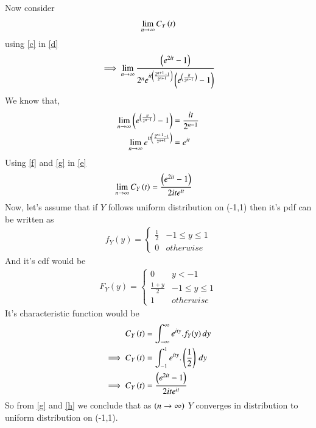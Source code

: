 \documentclass[journal,12pt,twocolumn]{IEEEtran}
\begin{document}
Now consider
\begin{align}
     \lim_{n\to\infty} C_{Y}\left(t\right)
     \label{d}
\end{align}
using \eqref{c} in \eqref{d}
\begin{align}
    \implies \lim_{n\to\infty}\frac{\left(e^{2it}-1\right)}{2^ne^{it\left(\frac{2^{n+1}-1}{2^{n+1}}\right)}\left(e^{\left(\frac{it}{2^{n-1}}\right)}-1\right)}
    \label{e}
\end{align}
We know that,
\begin{align}
    \lim_{n\to\infty}\left(e^{\left(\frac{it}{2^{n-1}}\right)}-1\right) &= \frac{it}{2^{n-1}}
    \label{f}\\
    \lim_{n\to\infty}e^{it\left(\frac{2^{n+1}-1}{2^{n+1}}\right)}&=e^{it}
    \label{g}
\end{align}
Using \eqref{f} and \eqref{g} in \eqref{e}
\begin{align}
    \lim_{n\to\infty} C_{Y}\left(t\right)&=\frac{\left(e^{2it}-1\right)}{2ite^{it}}
    \label{h}
\end{align}
Now, let's assume that if $Y$ follows uniform distribution on (-1,1) then it's pdf can be written as
\begin{align}
    f_{Y}(y)=\begin{cases} 
            \frac{1}{2}  &  -1\le y\le 1\\
            0 &  otherwise
            \end{cases}
\end{align}
And it's cdf would be
\begin{align}
    F_{Y}(y)=\begin{cases} 
            0 & y<-1\\
            \frac{1+y}{2}  &  -1\le y\le 1\\
            1 &  otherwise
            \end{cases}
\end{align}
It's characteristic function would be 
\begin{align}
   C_{Y}\left(t\right)&= \int_{-\infty}^{\infty} e^{ity}.f_{Y}(y) \,dy\\
    \implies C_{Y}\left(t\right)&=\int_{-1}^{1} e^{ity}.\left(\frac{1}{2}\right) \,dy\\
    \implies C_{Y}\left(t\right)&=\frac{\left(e^{2it}-1\right)}{2ite^{it}}
    \label{h}
\end{align}
So from \eqref{g} and \eqref{h} we conclude that as $\left(n\rightarrow\infty\right)$ $Y$ converges in distribution to uniform distribution on (-1,1).
\end{document}
